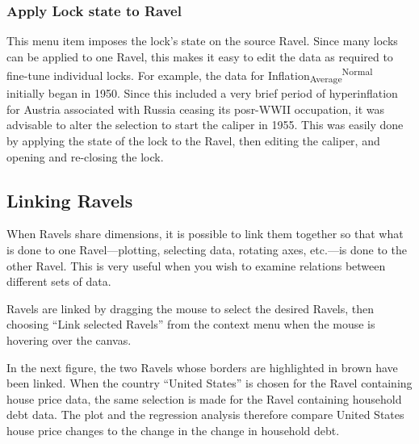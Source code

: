 \subsubsection{Apply Lock state to Ravel}

This menu item imposes the lock's state on the source Ravel. Since
many locks can be applied to one Ravel, this makes it easy to edit
the data as required to fine-tune individual locks. For example, the
data for Inflation\textsubscript{Average}\textsuperscript{Normal}
initially began in 1950. Since this included a very brief period of
hyperinflation for Austria associated with Russia ceasing its posr-WWII
occupation, it was advisable to alter the selection to start the caliper
in 1955. This was easily done by applying the state of the lock to
the Ravel, then editing the caliper, and opening and re-closing the
lock.

\subsection{Linking Ravels}

When Ravels share dimensions, it is possible to link them together
so that what is done to one Ravel---plotting, selecting data, rotating
axes, etc.---is done to the other Ravel. This is very useful when
you wish to examine relations between different sets of data.

Ravels are linked by dragging the mouse to select the desired Ravels,
then choosing ``Link selected Ravels'' from the context menu when
the mouse is hovering over the canvas.

In the next figure, the two Ravels whose borders are highlighted in
brown have been linked. When the country ``United States'' is chosen
for the Ravel containing house price data, the same selection is made
for the Ravel containing household debt data. The plot and the regression
analysis therefore compare United States house price changes to the
change in the change in household debt.

